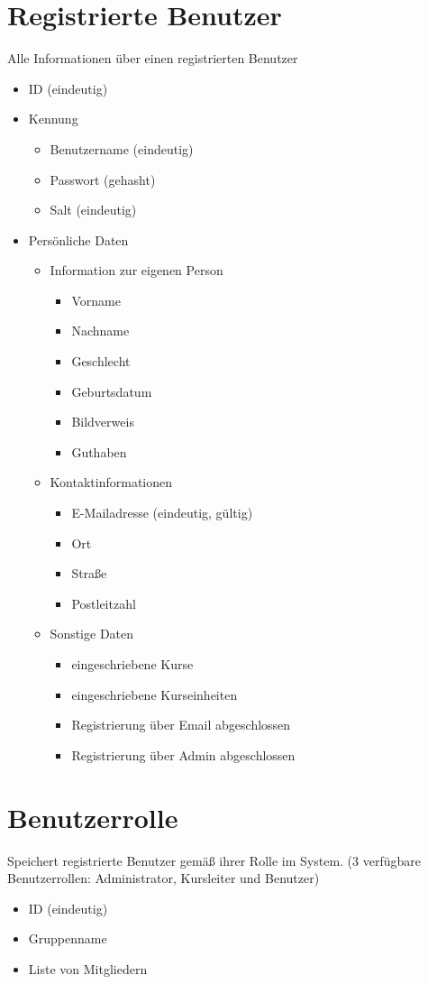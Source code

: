 \documentclass[a4paper]{scrreprt}
\newcounter{Lc}
\newcounter{Hc}
\newcommand{\stepHc}{\stepcounter{Hc}\setcounter{Lc}{0}}
\begin{document}
\section{Registrierte Benutzer}
\Func {} Alle Informationen über einen registrierten Benutzer
\begin{itemize}
	\item ID  (eindeutig)
	\item Kennung
	\begin{itemize}
		\item Benutzername (eindeutig)
		\item Passwort (gehasht)
		\item Salt (eindeutig)
	\end{itemize}
	\item Persönliche Daten
	\begin{itemize}
		\item Information zur eigenen Person	
		\begin{itemize}
			\item Vorname 
			\item Nachname 
			\item Geschlecht 
			\item Geburtsdatum 
			\item Bildverweis 
			\item Guthaben
		\end{itemize}
		\item Kontaktinformationen
		\begin{itemize}
			\item E-Mailadresse (eindeutig, gültig)
			\item Ort 
			\item Straße 
			\item Postleitzahl
		\end{itemize}
		\item Sonstige Daten
		\begin{itemize}
			\item eingeschriebene Kurse
			\item eingeschriebene Kurseinheiten
			\item Registrierung über Email abgeschlossen
			\item Registrierung über Admin abgeschlossen
		\end{itemize}	
	\end{itemize}
	
\end{itemize}


\stepHc	 
\section{Benutzerrolle}
\Func {} Speichert registrierte Benutzer gemäß ihrer Rolle im System. (3 verfügbare Benutzerrollen: Administrator, Kursleiter und Benutzer) 
\begin{itemize}
	\item ID (eindeutig)
	\item Gruppenname 
	\item Liste von Mitgliedern
\end{itemize}
\end{document}
